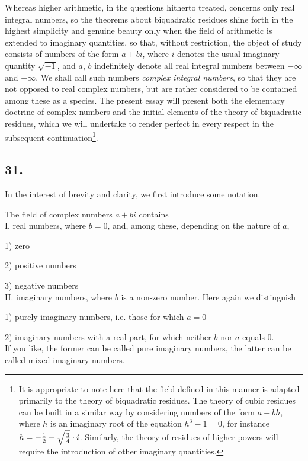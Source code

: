 \documentclass[twoside,12pt]{memoir}
\let\oldfrac\frac
\def\frac#1#2{\mathchoice{\tfrac{#1}{#2}}{\oldfrac{#1}{#2}}{\genfrac{}{}{}{2}{#1}{#2\mathstrut}}{\genfrac{}{}{}{3}{#1}{#2\mathstrut}}}
\begin{document}
Whereas higher arithmetic, in the questions hitherto treated, concerns only real integral numbers, so the theorems about biquadratic residues shine forth in the highest simplicity and genuine beauty only when the field of arithmetic is extended to imaginary quantities, so that, without restriction, the object of study consists of numbers of the form \(a+b i\), where \(i\) denotes the usual imaginary quantity \(\sqrt{-1}\), and \(a\), \(b\) indefinitely denote all real integral numbers between \(-\infty\) and \(+\infty\). We shall call such numbers \textit{complex integral numbers}, so that they are not opposed to real complex numbers, but are rather considered to be contained among these as a species. The present essay will present both the elementary doctrine of complex numbers and the initial elements of the theory of biquadratic residues, which we will undertake to render perfect in every respect in the subsequent continuation\footnote{It is appropriate to note here that the field defined in this manner is adapted primarily to the theory of biquadratic residues. The theory of cubic residues can be built in a similar way by considering numbers of the form \(a+b h\), where \(h\) is an imaginary root of the equation \(h^{3}-1=0\), for instance \(h=-\frac{1}{2}+\sqrt{\frac{3}{4}} \cdot i\).  Similarly, the theory of residues of higher powers will require the introduction of other imaginary quantities.}.
%

\subsection*{31.}

In the interest of brevity and clarity, we first introduce some notation.

The field of complex numbers \(a+bi\) contains\\
I. real numbers, where \(b=0\), and, among these, depending on the nature of \(a\),

1) zero

2) positive numbers

3) negative numbers\\
II. imaginary numbers, where \(b\) is a non-zero number. Here again we distinguish

1) purely imaginary numbers, i{.}e{.} those for which \(a=0\)

2) imaginary numbers with a real part, for which neither \(b\) nor \(a\) equals 0.\\
If you like, the former can be called pure imaginary numbers, the latter can be called mixed imaginary numbers.
%
\end{document}
